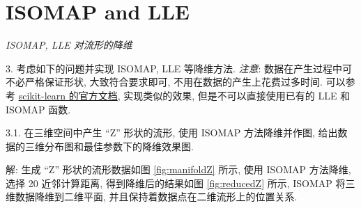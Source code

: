 \documentclass{article}
\begin{document}




\section*{ISOMAP and LLE}

\emph{ISOMAP, LLE 对流形的降维}

3. 考虑如下的问题并实现 ISOMAP, LLE 等降维方法. \emph{注意}: 数据在产生过程中可不必严格保证形状, 大致符合要求即可, 不用在数据的产生上花费过多时间. 可以参考 \href{https://scikit-learn.org/stable/auto_examples/manifold/plot_compare_methods.html\#sphx-glr-auto-examples-manifold-plot-compare-methods-py}{scikit-learn 的官方文档}, 实现类似的效果, 但是不可以直接使用已有的 LLE 和 ISOMAP 函数.

3.1. 在三维空间中产生 ``Z'' 形状的流形, 使用 ISOMAP 方法降维并作图, 给出数据的三维分布图和最佳参数下的降维效果图.

解: 生成 ``Z'' 形状的流形数据如图 \ref{fig:manifoldZ} 所示, 使用 ISOMAP 方法降维, 选择 20 近邻计算距离, 得到降维后的结果如图 \ref{fig:reducedZ} 所示, ISOMAP 将三维数据降维到二维平面, 并且保持着数据点在二维流形上的位置关系.
\end{document}
